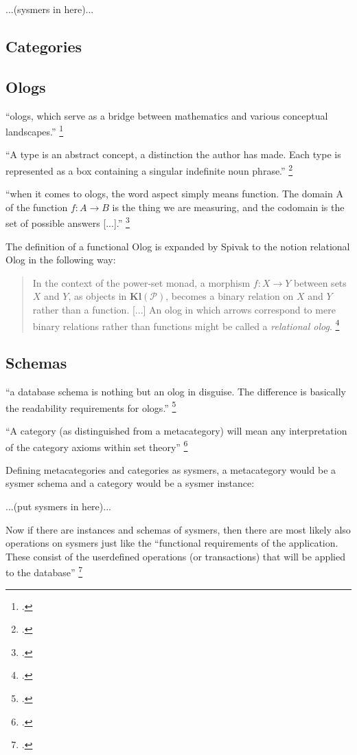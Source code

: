 \documentclass[12pt,a4paper]{article}
\begin{document}
...(sysmers in here)...

\subsection{Categories}

\subsection{Ologs}
``ologs, which serve as a bridge between mathematics and various conceptual landscapes.'' \footcite[24]{Spivak2014}

``A type is an abstract concept, a distinction the author has made. Each type is represented as a box containing a singular indefinite noun phrase.'' \footcite[25]{Spivak2014}

``when it comes to ologs, the word aspect simply means function. The domain A of the function \( f: A \to B \) is the thing we are measuring, and the codomain is the set of possible answers [...].'' \footcite[27]{Spivak2014}

The definition of a functional Olog is expanded by Spivak to the notion relational Olog in the following way:
\begin{quote}
In the context of the power-set monad, a morphism \( f: X \to Y \) between sets \( X \) and \( Y \), as objects in \( \textbf{Kl}(\mathcal{P}) \), becomes a binary relation on \( X \) and \( Y \) rather than a function. [...] An olog in which arrows correspond to mere binary relations rather than functions might 
be called a \textit{relational olog}. \footcite[447]{Spivak2014}
\end{quote}

\subsection{Schemas}
``a database schema is nothing but an olog in disguise. The diﬀerence is basically the readability requirements for ologs.'' \footcite[194]{Spivak2014}

``A category (as distinguished from a metacategory) will mean any interpretation of the category axioms within set theory'' \footcite[10]{MacLane1997}

Defining metacategories and categories as sysmers, a metacategory would be a sysmer schema and a category would be a sysmer instance:

...(put sysmers in here)...

Now if there are instances and schemas of sysmers, then there are most likely also operations on sysmers just like the ``functional requirements of the application. These consist of the userdefined operations (or transactions) that will be applied to the database'' \footcite[61]{ElmasriNavathe2015}
\end{document}
